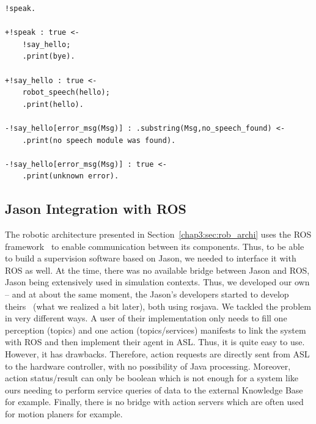 \documentclass[a4paper,11pt,twoside]{StyleThese}
\begin{document}
\begin{lstlisting}[caption={Example of plan failure handling}, label={chap4:lst:failure}]
!speak.

+!speak : true <- 
	!say_hello;
	.print(bye).

+!say_hello : true <-
	robot_speech(hello);
	.print(hello).

-!say_hello[error_msg(Msg)] : .substring(Msg,no_speech_found) <-
	.print(no speech module was found).

-!say_hello[error_msg(Msg)] : true <-
	.print(unknown error).	
\end{lstlisting} 

\subsection{Jason Integration with ROS}
The robotic architecture presented in Section~\ref{chap3:sec:rob_archi} uses the ROS framework~\citep{quigley_2009_ros} to enable communication between its components. Thus, to be able to build a supervision software based on Jason, we needed to interface it with ROS as well. At the time, there was no available bridge between Jason and ROS, Jason being extensively used in simulation contexts. Thus, we developed our own -- and at about the same moment, the Jason's developers started to develop theirs~\citep{silva_2020_embedded} (what we realized a bit later), both using rosjava. We tackled the problem in very different ways. A user of their implementation only needs to fill one perception (topics) and one action (topics/services) manifests to link the system with ROS and then implement their agent in ASL. Thus, it is quite easy to use. However, it has drawbacks. Therefore, action requests are directly sent from ASL to the hardware controller, with no possibility of Java processing. Moreover, action status/result can only be boolean which is not enough for a system like ours needing to perform service queries of data to the external Knowledge Base for example. Finally, there is no bridge with action servers which are often used for motion planers for example. 
\end{document}

